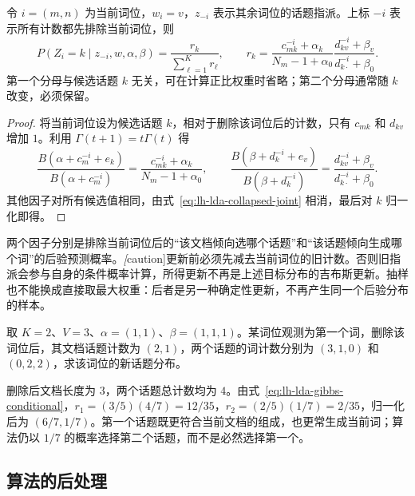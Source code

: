 \begin{proposition}[单词位的满条件分布]
\label{prop:lh-lda-gibbs-conditional}
令 $i=(m,n)$ 为当前词位，$w_i=v$，$z_{-i}$ 表示其余词位的话题指派。上标 $-i$ 表示所有计数都先排除当前词位，则
\begin{equation}
P(Z_i=k\mid z_{-i},w,\alpha,\beta)
=\frac{r_k}{\sum_{\ell=1}^Kr_\ell},\qquad
r_k=\frac{c_{mk}^{-i}+\alpha_k}{N_m-1+\alpha_0}
\frac{d_{kv}^{-i}+\beta_v}{d_{k\cdot}^{-i}+\beta_0}.
\label{eq:lh-lda-gibbs-conditional}
\end{equation}
第一个分母与候选话题 $k$ 无关，可在计算正比权重时省略；第二个分母通常随 $k$ 改变，必须保留。
\end{proposition}
\begin{proof}
将当前词位设为候选话题 $k$，相对于删除该词位后的计数，只有 $c_{mk}$ 和 $d_{kv}$ 增加 $1$。利用 $\Gamma(t+1)=t\Gamma(t)$ 得
\[
\frac{B(\alpha+c_m^{-i}+e_k)}{B(\alpha+c_m^{-i})}
=\frac{c_{mk}^{-i}+\alpha_k}{N_m-1+\alpha_0},\qquad
\frac{B(\beta+d_k^{-i}+e_v)}{B(\beta+d_k^{-i})}
=\frac{d_{kv}^{-i}+\beta_v}{d_{k\cdot}^{-i}+\beta_0}.
\]
其他因子对所有候选值相同，由式~\eqref{eq:lh-lda-collapsed-joint} 相消，最后对 $k$ 归一化即得。
\end{proof}

两个因子分别是排除当前词位后的“该文档倾向选哪个话题”和“该话题倾向生成哪个词”的后验预测概率。\emph[caution]{更新前必须先减去当前词位的旧计数。}否则旧指派会参与自身的条件概率计算，所得更新不再是上述目标分布的吉布斯更新。抽样也不能换成直接取最大权重：后者是另一种确定性更新，不再产生同一个后验分布的样本。

\begin{example}
\label{ex:lh-lda-gibbs-step}
取 $K=2$、$V=3$、$\alpha=(1,1)$、$\beta=(1,1,1)$。某词位观测为第一个词，删除该词位后，其文档话题计数为 $(2,1)$，两个话题的词计数分别为 $(3,1,0)$ 和 $(0,2,2)$，求该词位的新话题分布。
\end{example}
\begin{solve}
删除后文档长度为 $3$，两个话题总计数均为 $4$。由式~\eqref{eq:lh-lda-gibbs-conditional}，$r_1=(3/5)(4/7)=12/35$，$r_2=(2/5)(1/7)=2/35$，归一化后为 $(6/7,1/7)$。第一个话题既更符合当前文档的组成，也更常生成当前词；算法仍以 $1/7$ 的概率选择第二个话题，而不是必然选择第一个。
\end{solve}

\subsection{算法的后处理}
\label{subsec:lh-lda-gibbs-postprocessing}

